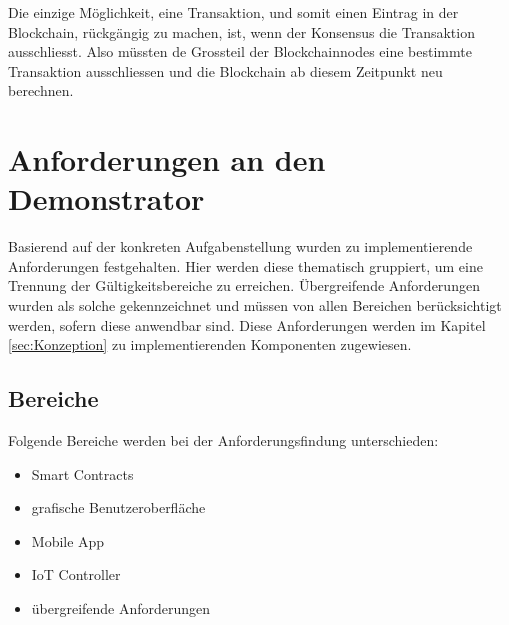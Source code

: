 Die einzige Möglichkeit, eine Transaktion, und somit einen Eintrag in der Blockchain, rückgängig zu machen, ist, wenn der Konsensus die Transaktion ausschliesst. Also müssten de Grossteil der Blockchainnodes eine bestimmte Transaktion ausschliessen und die Blockchain ab diesem Zeitpunkt neu berechnen. \cite{BlockchainRevolution}


\section{Anforderungen an den Demonstrator}
\label{sec:Anforderungen_Demonstrator}
Basierend auf der konkreten Aufgabenstellung wurden zu implementierende Anforderungen festgehalten. Hier werden diese thematisch gruppiert, um eine Trennung der Gültigkeitsbereiche zu erreichen. Übergreifende Anforderungen wurden als solche gekennzeichnet und müssen von allen Bereichen berücksichtigt werden, sofern diese anwendbar sind. Diese Anforderungen werden im Kapitel \ref{sec:Konzeption}  zu implementierenden Komponenten zugewiesen.

\subsection{Bereiche}
Folgende Bereiche werden bei der Anforderungsfindung unterschieden:
\begin{itemize}
    \item Smart Contracts
    \item grafische Benutzeroberfläche
    \item Mobile App
    \item IoT Controller
    \item übergreifende Anforderungen
\end{itemize}

